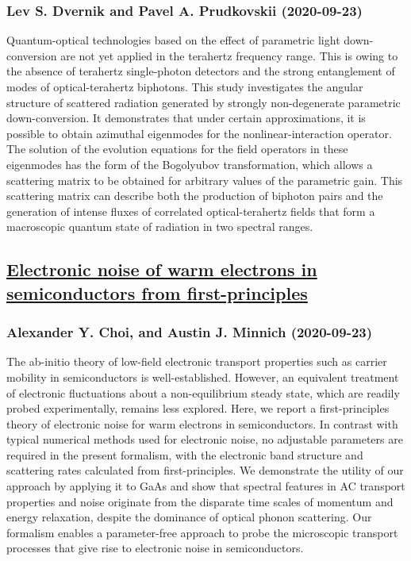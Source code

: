 \subsubsection*{Lev S. Dvernik and Pavel A. Prudkovskii (2020-09-23)}
Quantum-optical technologies based on the effect of parametric light
down-conversion are not yet applied in the terahertz frequency range. This is
owing to the absence of terahertz single-photon detectors and the strong
entanglement of modes of optical-terahertz biphotons. This study investigates
the angular structure of scattered radiation generated by strongly
non-degenerate parametric down-conversion. It demonstrates that under certain
approximations, it is possible to obtain azimuthal eigenmodes for the
nonlinear-interaction operator. The solution of the evolution equations for the
field operators in these eigenmodes has the form of the Bogolyubov
transformation, which allows a scattering matrix to be obtained for arbitrary
values of the parametric gain. This scattering matrix can describe both the
production of biphoton pairs and the generation of intense fluxes of correlated
optical-terahertz fields that form a macroscopic quantum state of radiation in
two spectral ranges.

\subsection*{\href{http://arxiv.org/abs/2009.11395v1}{Electronic noise of warm electrons in semiconductors from  first-principles}}
\subsubsection*{Alexander Y. Choi, and Austin J. Minnich (2020-09-23)}
The ab-initio theory of low-field electronic transport properties such as
carrier mobility in semiconductors is well-established. However, an equivalent
treatment of electronic fluctuations about a non-equilibrium steady state,
which are readily probed experimentally, remains less explored. Here, we report
a first-principles theory of electronic noise for warm electrons in
semiconductors. In contrast with typical numerical methods used for electronic
noise, no adjustable parameters are required in the present formalism, with the
electronic band structure and scattering rates calculated from
first-principles. We demonstrate the utility of our approach by applying it to
GaAs and show that spectral features in AC transport properties and noise
originate from the disparate time scales of momentum and energy relaxation,
despite the dominance of optical phonon scattering. Our formalism enables a
parameter-free approach to probe the microscopic transport processes that give
rise to electronic noise in semiconductors.

